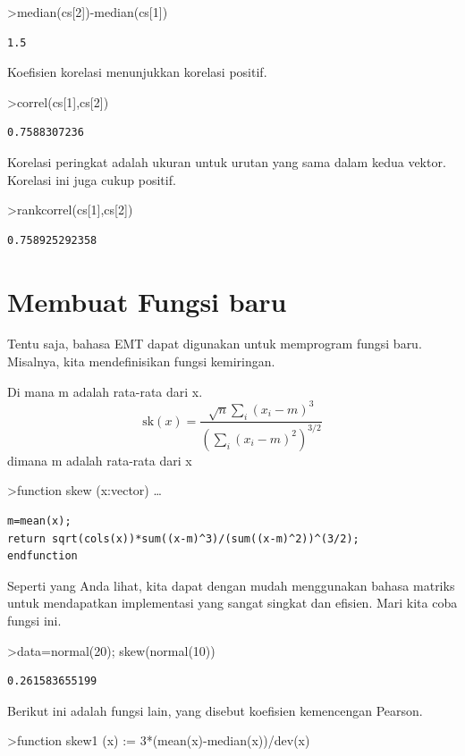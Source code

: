 \documentclass[
]{book}
\begin{document}
\textgreater median(cs{[}2{]})-median(cs{[}1{]})

\begin{verbatim}
1.5
\end{verbatim}

Koefisien korelasi menunjukkan korelasi positif.

\textgreater correl(cs{[}1{]},cs{[}2{]})

\begin{verbatim}
0.7588307236
\end{verbatim}

Korelasi peringkat adalah ukuran untuk urutan yang sama dalam kedua vektor. Korelasi ini juga cukup positif.

\textgreater rankcorrel(cs{[}1{]},cs{[}2{]})

\begin{verbatim}
0.758925292358
\end{verbatim}

\section{Membuat Fungsi baru}\label{membuat-fungsi-baru}

Tentu saja, bahasa EMT dapat digunakan untuk memprogram fungsi baru. Misalnya, kita mendefinisikan fungsi kemiringan.

Di mana m adalah rata-rata dari x. \[\text{sk}(x) = \dfrac{\sqrt{n} \sum_i (x_i-m)^3}{\left(\sum_i (x_i-m)^2\right)^{3/2}}\]dimana m adalah rata-rata dari x

\textgreater function skew (x:vector) \ldots{}

\begin{verbatim}
m=mean(x);
return sqrt(cols(x))*sum((x-m)^3)/(sum((x-m)^2))^(3/2);
endfunction
\end{verbatim}

Seperti yang Anda lihat, kita dapat dengan mudah menggunakan bahasa matriks untuk mendapatkan implementasi yang sangat singkat dan efisien. Mari kita coba fungsi ini.

\textgreater data=normal(20); skew(normal(10))

\begin{verbatim}
0.261583655199
\end{verbatim}

Berikut ini adalah fungsi lain, yang disebut koefisien kemencengan Pearson.

\textgreater function skew1 (x) := 3*(mean(x)-median(x))/dev(x)
\end{document}
